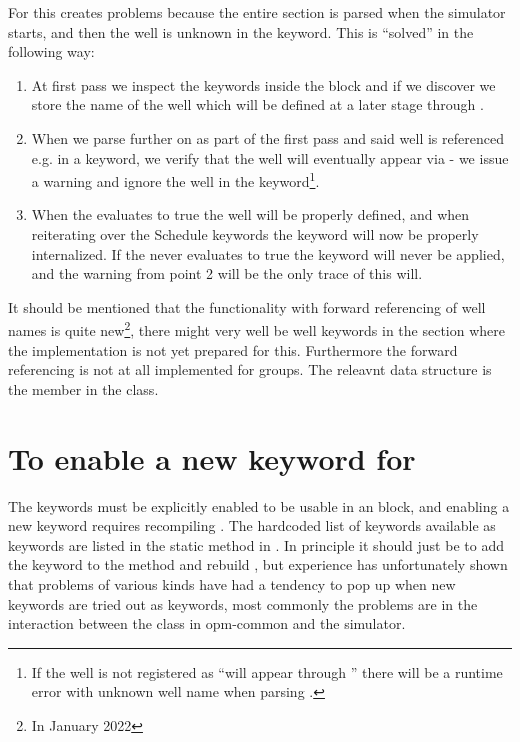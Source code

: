 For \flow{} this creates problems because the entire  section is
parsed when the simulator starts, and then the well  is unknown in the
 keyword. This is ``solved'' in the following way:
\begin{enumerate}
\item At first pass we inspect the keywords inside the \actionx{} block and if
  we discover  we store the name of the well which will be defined
  at a later stage through \actionx{}.
\item When we parse further on as part of the first pass and said well is
  referenced e.g. in a  keyword, we verify that the well will
  eventually appear via \actionx{} - we issue a warning and ignore the well in
  the  keyword\footnote{If the well is not registered as ``will
  appear through \actionx{}'' there will be a runtime error with unknown well
  name when parsing .}.
\item When the \actionx{} evaluates to true the well will be properly defined,
  and when reiterating over the Schedule keywords the  keyword will
  now be properly internalized. If the \actionx{} never evaluates to true the
   keyword will never be applied, and the warning from point 2 will
  be the only trace of this will.
\end{enumerate}
It should be mentioned that the functionality with forward referencing of well
names is quite new\footnote{In January 2022}, there might very well be well
keywords in the  section where the implementation is not yet
prepared for this. Furthermore the forward referencing is not at all implemented
for groups. The releavnt data structure is the member
 in the  class.


\section{To enable a new keyword for \actionx}
The keywords must be explicitly enabled to be usable in an \actionx{} block, and
enabling a new keyword requires recompiling \flow{}. The hardcoded list of
keywords available as \actionx{} keywords are listed in the static method
 in
. In principle it should
just be to add the keyword to the  method
and rebuild \flow{}, but experience has unfortunately shown that problems of
various kinds have had a tendency to pop up when new keywords are tried out as
\actionx{} keywords, most commonly the problems are in the interaction between
the  class in opm-common and the simulator.

